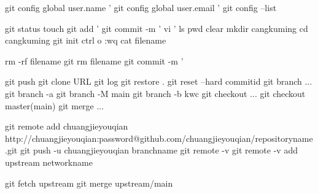 git config global user.name '%
git config global user.email '%
git config --list %

git status
touch %
git add '%
git commit -m '%
vi '%
ls %
pwd %
clear
mkdir cangkuming  %
cd cangkuming %
git init %
ctrl o %
:wq   %
cat filename %

rm -rf filename
git rm filename
git commit -m '%

git push %
git clone URL
git log %
git restore . %
git reset --hard commitid %
git branch ... %
git branch -a %
git branch -M main %
git branch -b kwc %
git checkout ...%
git checkout master(main) %
git merge ... %

git remote add chuangjieyouqian http://chuangjieyouqian:password@github.com/chuangjieyouqian/repositoryname.git
git push -u chuangjieyouqian branchname %
git remote -v %
git remote -v add upstream networkname 

git fetch upstream %
git merge upstream/main %
